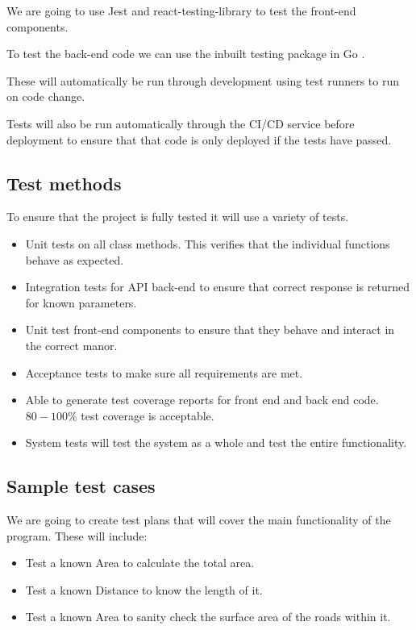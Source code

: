 \documentclass[a4paper,11pt]{article}
\begin{document}
We are going to use Jest \autocite{jest:11} and react-testing-library
\autocite{rtl:12} to test the front-end components.

To test the back-end code we can use the inbuilt testing package in Go
\autocite{go:13}.

These will automatically be run through development using test runners to run on
code change.

Tests will also be run automatically through the CI/CD service before deployment
to ensure that that code is only deployed if the tests have passed.

\subsection{Test methods}

To ensure that the project is fully tested it will use a variety of tests.

\begin{itemize}
  \item Unit tests on all class methods. This verifies that the individual
    functions behave as expected.
  \item Integration tests for API back-end to ensure that correct response is
    returned for known parameters.
  \item Unit test front-end components to ensure that they behave and interact
    in the correct manor.
  \item Acceptance tests to make sure all requirements are met.
  \item Able to generate test coverage reports for front end and back end code.
    $80-100\%$ test coverage is acceptable.
  \item System tests will test the system as a whole and test the entire
    functionality.
\end{itemize}

\subsection{Sample test cases}

We are going to create test plans that will cover the main functionality of the
program. These will include:

\begin{itemize}
  \item Test a known Area to calculate the total area.
  \item Test a known Distance to know the length of it.
  \item Test a known Area to sanity check the surface area of the roads within
    it.
\end{itemize}
\end{document}
